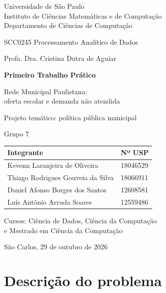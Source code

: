 \documentclass[11pt,a4paper]{article}
\begin{document}
\begin{titlepage}
\centering
{\large Universidade de São Paulo\\Instituto de Ciências Matemáticas e de Computação\\Departamento de Ciências de Computação\par}
\vspace{1.6cm}
{\large SCC0245 Processamento Analítico de Dados\par}
{\normalsize Profa. Dra. Cristina Dutra de Aguiar\par}
\vspace{2.4cm}
{\LARGE\bfseries Primeiro Trabalho Prático\par}
\vspace{0.5cm}
{\Large Rede Municipal Paulistana:\\oferta escolar e demanda não atendida\par}
\vspace{0.3cm}
{\normalsize Projeto temático: política pública municipal\par}
\vspace{2.4cm}
{\normalsize Grupo 7\par}
\vspace{0.2cm}
\begin{tabular}{ll}
\toprule
\textbf{Integrante} & \textbf{Nº USP} \\
\midrule
Kevenn Laranjeira de Oliveira & 18046529 \\
Thiago Rodrigues Gouveia da Silva & 18066911 \\
Daniel Afonso Borges dos Santos & 12608581 \\
Luís Antônio Arruda Soares & 12559486 \\
\bottomrule
\end{tabular}
\par\vspace{0.4cm}
{\normalsize Cursos: Ciência de Dados, Ciência da Computação\\e Mestrado em Ciência da Computação\par}
\vfill
{\large São Carlos, 29 de outubro de 2026\par}
\end{titlepage}

\tableofcontents
\clearpage

\section{Descrição do problema}
\end{document}
